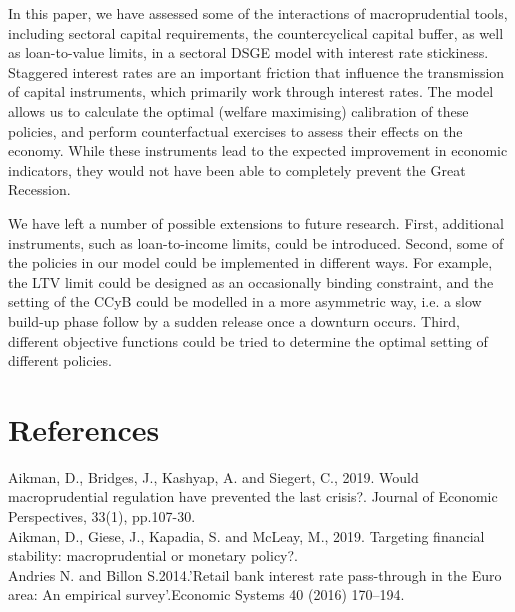 \documentclass[12pt]{article}
\numberwithin{equation}{section}
\begin{document}
In this paper, we have assessed some of the interactions of macroprudential tools, including sectoral capital requirements, the countercyclical capital buffer, as well as loan-to-value limits, in a sectoral DSGE model with interest rate stickiness. Staggered interest rates are an important friction that influence the transmission of capital instruments, which primarily work through interest rates. The model allows us to calculate the optimal (welfare maximising) calibration of these policies, and perform counterfactual exercises to assess their effects on the economy. While these instruments lead to the expected improvement in economic indicators, they would not have been able to completely prevent the Great Recession.

We have left a number of possible extensions to future research. First, additional instruments, such as loan-to-income limits, could be introduced. Second, some of the policies in our model could be implemented in different ways. For example, the LTV limit could be designed as an occasionally binding constraint, and the setting of the CCyB could be modelled in a more asymmetric way, i.e. a slow build-up phase follow by a sudden release once a downturn occurs. Third, different objective functions could be tried to determine the optimal setting of different policies.
















\section{References}

\hspace*{0.6cm}

Aikman, D., Bridges, J., Kashyap, A. and Siegert, C., 2019. Would macroprudential regulation have prevented the last crisis?. Journal of Economic Perspectives, 33(1), pp.107-30. \\

Aikman, D., Giese, J., Kapadia, S. and McLeay, M., 2019. Targeting financial stability: macroprudential or monetary policy?. \\

Andries N. and Billon S.2014.'Retail bank interest rate pass-through in the Euro area: An empirical survey'.Economic Systems 40 (2016) 170–194.\\
\end{document}
